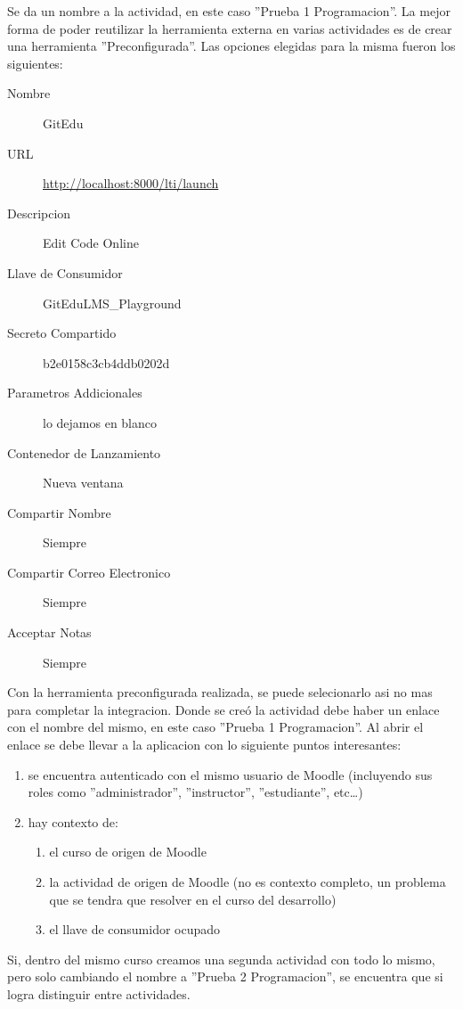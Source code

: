 Se da un nombre a la actividad, en este caso ''Prueba 1 Programacion''. La mejor forma de poder reutilizar la herramienta externa en varias actividades es de crear una herramienta ''Preconfigurada''. Las opciones elegidas para la misma fueron los siguientes:
\begin{description}
	\item[Nombre] GitEdu
    \item[URL] \url{http://localhost:8000/lti/launch}
    \item[Descripcion] Edit Code Online
    \item[Llave de Consumidor] GitEduLMS\_Playground
    \item[Secreto Compartido] b2e0158c3cb4ddb0202d
    \item[Parametros Addicionales] lo dejamos en blanco
    \item[Contenedor de Lanzamiento] Nueva ventana
    \item[Compartir Nombre] Siempre
    \item[Compartir Correo Electronico] Siempre
    \item[Acceptar Notas] Siempre
\end{description}
Con la herramienta preconfigurada realizada, se puede selecionarlo asi no mas para completar la integracion. Donde se creó la actividad debe haber un enlace con el nombre del mismo, en este caso ''Prueba 1 Programacion''. Al abrir el enlace se debe llevar a la aplicacion con lo siguiente puntos interesantes:
\begin{enumerate}
	\item se encuentra autenticado con el mismo usuario de Moodle (incluyendo sus roles como ''administrador'', ''instructor'', ''estudiante'', etc\ldots{})
    \item hay contexto de:
    \begin{enumerate}
    	\item el curso de origen de Moodle
        \item la actividad de origen de Moodle (no es contexto completo, un problema que se tendra que resolver en el curso del desarrollo)
        \item el llave de consumidor ocupado
    \end{enumerate}
\end{enumerate}

Si, dentro del mismo curso creamos una segunda actividad con todo lo mismo, pero solo cambiando el nombre a ''Prueba 2 Programacion'', se encuentra que si logra distinguir entre actividades.

